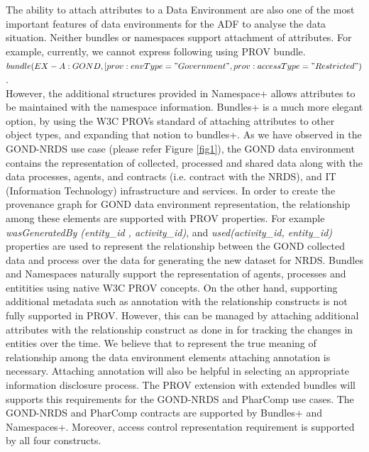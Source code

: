 The ability to attach attributes to a Data Environment are also one of the most important features of data environments for the ADF to analyse the data situation. Neither bundles or namespaces support attachment of attributes. For example, currently, we cannot express following  using PROV bundle.  \\
 \begin{math}bundle (EX-A:GOND, [prov:envType ="Government", prov:accessType="Restricted") \end{math}. \\
However, the additional structures provided in Namespace+ allows attributes to be maintained with the namespace information. Bundles+ is a much more elegant option, by using the W3C PROVs standard of attaching attributes to other object types, and expanding that notion to bundles+.
 As we have observed in the GOND-NRDS use case (please refer Figure \ref{fig1}), the GOND data environment contains the representation of  collected, processed and shared data along with the data processes, agents, and contracts (i.e. contract with the NRDS), and IT (Information Technology) infrastructure and services. In order to create the provenance graph for GOND data environment representation, the relationship among these elements are supported with PROV properties. For example  \textit{ wasGeneratedBy (entity\_id , activity\_id)}, and \textit{used(activity\_id, entity\_id)} properties are used to represent the relationship between the GOND collected data and process over the data for generating the new dataset for NRDS. Bundles and Namespaces naturally support the representation of agents, processes and entitities using native W3C PROV concepts. On the other hand, supporting additional metadata such as annotation with the relationship constructs is not fully supported in PROV. However, this  can be managed  by attaching additional attributes with the relationship construct as done  in  \cite{pimentel2018versioned} for tracking the changes in entities over the time. We believe that to represent the true meaning of relationship among the data environment elements attaching annotation is necessary. Attaching annotation will also be helpful in selecting an appropriate information disclosure process. %
 The  PROV extension with extended bundles will supports this requirements for the GOND-NRDS and PharComp use cases. The GOND-NRDS  and PharComp  contracts are  supported by Bundles+  and Namespaces+.
 Moreover, access  control representation requirement is supported by all four constructs.  






     

